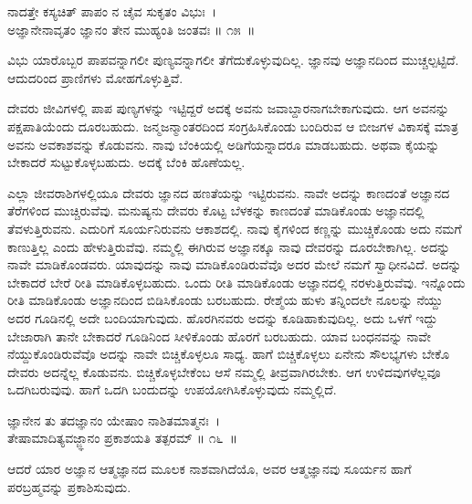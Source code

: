 \begin{shloka}
ನಾದತ್ತೇ ಕಸ್ಯಚಿತ್ ಪಾಪಂ ನ ಚೈವ ಸುಕೃತಂ ವಿಭುಃ~।\\ಅಜ್ಞಾನೇನಾವೃತಂ ಜ್ಞಾನಂ ತೇನ ಮುಹ್ಯಂತಿ ಜಂತವಃ \hfill॥ ೧೫~॥
\end{shloka}

\begin{artha}
ವಿಭು ಯಾರೊಬ್ಬರ ಪಾಪವನ್ನಾಗಲೀ ಪುಣ್ಯವನ್ನಾಗಲೀ ತೆಗೆದುಕೊಳ್ಳುವುದಿಲ್ಲ. ಜ್ಞಾನವು ಅಜ್ಞಾನದಿಂದ ಮುಚ್ಚಲ್ಪಟ್ಟಿದೆ. ಆದುದರಿಂದ ಪ್ರಾಣಿಗಳು ಮೋಹಗೊಳ್ಳುತ್ತಿವೆ.
\end{artha}

ದೇವರು ಜೀವಿಗಳಲ್ಲಿ ಪಾಪ ಪುಣ್ಯಗಳನ್ನು ಇಟ್ಟಿದ್ದರೆ ಅದಕ್ಕೆ ಅವನು ಜವಾಬ್ದಾರನಾಗಬೇಕಾಗುವುದು. ಆಗ ಅವನನ್ನು ಪಕ್ಷಪಾತಿಯೆಂದು ದೂರಬಹುದು. ಜನ್ಮಜನ್ಮಾಂತರದಿಂದ ಸಂಗ್ರಹಿಸಿಕೊಂಡು ಬಂದಿರುವ ಆ ಬೀಜಗಳ ವಿಕಾಸಕ್ಕೆ ಮಾತ್ರ ಅವನು ಅವಕಾಶವನ್ನು ಕೊಡುವನು. ನಾವು ಬೆಂಕಿಯಲ್ಲಿ ಅಡಿಗೆಯನ್ನಾದರೂ ಮಾಡಬಹುದು. ಅಥವಾ ಕೈಯನ್ನು ಬೇಕಾದರೆ ಸುಟ್ಟುಕೊಳ್ಳಬಹುದು. ಅದಕ್ಕೆ ಬೆಂಕಿ ಹೊಣೆಯಲ್ಲ.

ಎಲ್ಲಾ ಜೀವರಾಶಿಗಳಲ್ಲಿಯೂ ದೇವರು ಜ್ಞಾನದ ಹಣತೆಯನ್ನು ಇಟ್ಟಿರುವನು. ನಾವೇ ಅದನ್ನು ಕಾಣದಂತೆ ಅಜ್ಞಾನದ ತೆರೆಗಳಿಂದ ಮುಚ್ಚಿರುವೆವು. ಮನುಷ್ಯನು ದೇವರು ಕೊಟ್ಟ ಬೆಳಕನ್ನು ಕಾಣದಂತೆ ಮಾಡಿಕೊಂಡು ಅಜ್ಞಾನದಲ್ಲಿ ತೆವಳುತ್ತಿರುವನು. ಎದುರಿಗೆ ಸೂರ್ಯನಿರು\-ವನು ಆಕಾಶದಲ್ಲಿ. ನಾವು ಕೈಗಳಿಂದ ಕಣ್ಣನ್ನು ಮುಚ್ಚಿಕೊಂಡು ಅದು ನಮಗೆ ಕಾಣುತ್ತಿಲ್ಲ ಎಂದು ಹೇಳುತ್ತಿರುವೆವು. ನಮ್ಮಲ್ಲಿ ಈಗಿರುವ ಅಜ್ಞಾನಕ್ಕೂ ನಾವು ದೇವರನ್ನು ದೂರಬೇಕಾಗಿಲ್ಲ. ಅದನ್ನು ನಾವೇ ಮಾಡಿಕೊಂಡವರು. ಯಾವುದನ್ನು ನಾವು ಮಾಡಿಕೊಂಡಿರುವೆವೊ ಅದರ ಮೇಲೆ ನಮಗೆ ಸ್ವಾಧೀನವಿದೆ. ಅದನ್ನು ಬೇಕಾದರೆ ಬೇರೆ ರೀತಿ ಮಾಡಿಕೊಳ್ಳಬಹುದು. ಒಂದು ರೀತಿ ಮಾಡಿಕೊಂಡು ಅಜ್ಞಾನದಲ್ಲಿ ನರಳುತ್ತಿರುವೆವು. ಇನ್ನೊಂದು ರೀತಿ ಮಾಡಿಕೊಂಡು ಅಜ್ಞಾನದಿಂದ ಬಿಡಿಸಿಕೊಂಡು ಬರಬಹುದು. ರೇಶ್ಮೆಯ ಹುಳು ತನ್ನಿಂದಲೇ ನೂಲನ್ನು ನೆಯ್ದು ಅದರ ಗೂಡಿನಲ್ಲಿ ಅದೇ ಬಂದಿಯಾಗುವುದು. ಹೊರಗಿನವರು ಅದನ್ನು ಕೂಡಿಹಾಕುವುದಿಲ್ಲ. ಅದು ಒಳಗೆ ಇದ್ದು ಬೇಜಾರಾಗಿ ತಾನೇ ಬೇಕಾದರೆ ಗೂಡಿನಿಂದ ಸೀಳಿಕೊಂಡು ಹೊರಗೆ ಬರಬಹುದು. ಯಾವ ಬಂಧನವನ್ನು ನಾವೇ ನೆಯ್ದುಕೊಂಡಿರುವೆವೊ ಅದನ್ನು ನಾವೇ ಬಿಚ್ಚಿಕೊಳ್ಳಲೂ ಸಾಧ್ಯ. ಹಾಗೆ ಬಿಚ್ಚಿಕೊಳ್ಳಲು ಏನೇನು ಸೌಲಭ್ಯಗಳು ಬೇಕೊ ದೇವರು ಅದನ್ನೆಲ್ಲ ಕೊಡುವನು. ಬಿಚ್ಚಿಕೊಳ್ಳಬೇಕೆಂಬ ಆಸೆ ನಮ್ಮಲ್ಲಿ ತೀವ್ರವಾಗಿರಬೇಕು. ಆಗ ಉಳಿದವುಗಳೆಲ್ಲವೂ ಒದಗಿಬರುವುವು. ಹಾಗೆ ಒದಗಿ ಬಂದುದನ್ನು ಉಪಯೋಗಿಸಿಕೊಳ್ಳುವುದು ನಮ್ಮಲ್ಲಿದೆ.

\begin{shloka}
ಜ್ಞಾನೇನ ತು ತದಜ್ಞಾನಂ ಯೇಷಾಂ ನಾಶಿತಮಾತ್ಮನಃ~।\\ತೇಷಾಮಾದಿತ್ಯವಜ್ಜ್ಞಾನಂ ಪ್ರಕಾಶಯತಿ ತತ್ಪರಮ್ \hfill॥ ೧೬~॥
\end{shloka}

\begin{artha}
ಆದರೆ ಯಾರ ಅಜ್ಞಾನ ಆತ್ಮಜ್ಞಾನದ ಮೂಲಕ ನಾಶವಾಗಿದೆಯೊ, ಅವರ ಆತ್ಮಜ್ಞಾನವು ಸೂರ್ಯನ ಹಾಗೆ ಪರಬ್ರಹ್ಮವನ್ನು ಪ್ರಕಾಶಿಸುವುದು.
\end{artha}


